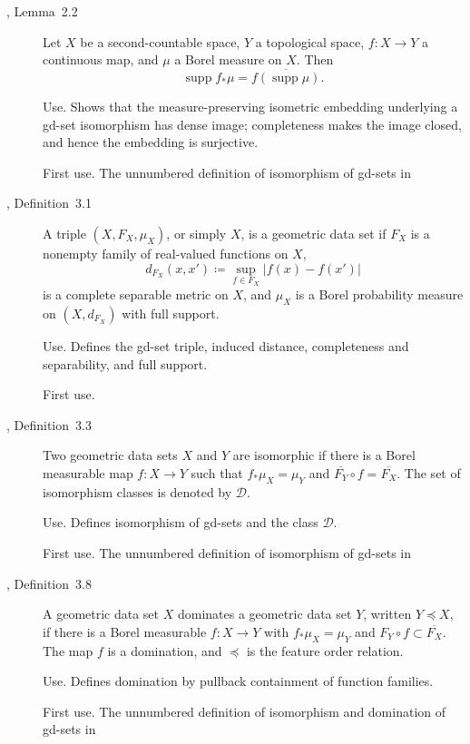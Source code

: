 \documentclass{amsart}
\theoremstyle{plain}
\theoremstyle{definition}
\theoremstyle{remark}
\newcommand{\D}{\mathcal{D}}
\DeclareMathOperator{\supp}{supp}
\begin{document}
\begingroup\raggedright
\begin{description}
\item[\cite{gds1}, Lemma~2.2]
Let $X$ be a second-countable space, $Y$ a topological space, $f\colon X\to Y$ a continuous map, and $\mu$ a Borel measure on $X$. Then
\[\supp f_*\mu=\overline{f(\supp\mu)}.\]

\textup{Use.} Shows that the measure-preserving isometric embedding underlying a gd-set isomorphism has dense image; completeness makes the image closed, and hence the embedding is surjective.

\textup{First use.} The unnumbered definition of isomorphism of gd-sets in 

\item[\cite{gds1}, Definition~3.1]
A triple $(X,F_X,\mu_X)$, or simply $X$, is a geometric data set if $F_X$ is a nonempty family of real-valued functions on $X$,
\[d_{F_X}(x,x')\coloneqq\sup_{f\in F_X}|f(x)-f(x')|\]
is a complete separable metric on $X$, and $\mu_X$ is a Borel probability measure on $(X,d_{F_X})$ with full support.

\textup{Use.} Defines the gd-set triple, induced distance, completeness and separability, and full support.

\textup{First use.} 

\item[\cite{gds1}, Definition~3.3]
Two geometric data sets $X$ and $Y$ are isomorphic if there is a Borel measurable map $f\colon X\to Y$ such that $f_*\mu_X=\mu_Y$ and $\overline{F_Y}\circ f=\overline{F_X}$. The set of isomorphism classes is denoted by $\D$.

\textup{Use.} Defines isomorphism of gd-sets and the class $\D$.

\textup{First use.} The unnumbered definition of isomorphism of gd-sets in 

\item[\cite{gds1}, Definition~3.8]
A geometric data set $X$ dominates a geometric data set $Y$, written $Y\preceq X$, if there is a Borel measurable $f\colon X\to Y$ with $f_*\mu_X=\mu_Y$ and $F_Y\circ f\subset\overline{F_X}$. The map $f$ is a domination, and $\preceq$ is the feature order relation.

\textup{Use.} Defines domination by pullback containment of function families.

\textup{First use.} The unnumbered definition of isomorphism and domination of gd-sets in 


\end{description}
\end{document}
